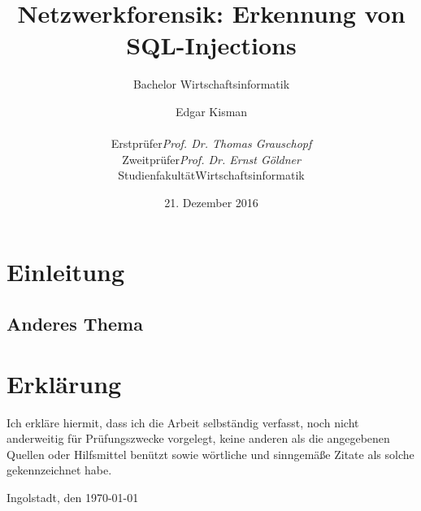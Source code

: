 

\title{Netzwerkforensik: Erkennung von SQL-Injections}
\subtitle{Bachelor Wirtschaftsinformatik}
\subject{BACHELORARBEIT}

\author{Edgar Kisman \\[0.5cm]
\begin{tabular}{rl}
Erstprüfer & \emph{Prof. Dr. Thomas Grauschopf}\\
Zweitprüfer & \emph{Prof. Dr. Ernst Göldner}\\
Studienfakultät & {Wirtschaftsinformatik}
\end{tabular}
}

\date{21. Dezember 2016}

\usepackage{tikz}


\tableofcontents
\clearpage
\listoffigures
\clearpage

\chapter{Einleitung}
\blindtext
\section{Anderes Thema}
\blindtext[3]

\printbibliography


\chapter*{Erklärung}
Ich erkläre hiermit, dass ich die Arbeit selbständig verfasst, noch nicht anderweitig für Prüfungszwecke vorgelegt, keine anderen als die angegebenen Quellen oder Hilfsmittel benützt sowie wörtliche und sinngemäße Zitate als solche gekennzeichnet habe.

\vspace{3\baselineskip}
\noindent Ingolstadt, den \today

\par\noindent\makebox[2.5in]{} \hfill\makebox[2.0in]{\hrulefill}%
\\\hspace*{8cm}{Max Mustermann}




